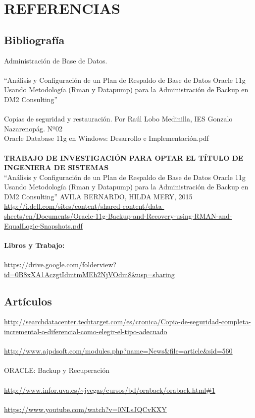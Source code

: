 \chapter{REFERENCIAS}
\section{Bibliografía}
Administración de Base de Datos.\\\\“Análisis y Configuración de un Plan de Respaldo de Base de Datos Oracle 11g Usando Metodología (Rman y Datapump) para la Administración de Backup en DM2 Consulting”\\\\Copias de seguridad y restauración. Por Raúl Lobo Medinilla, IES Gonzalo Nazarenopág. Nº02\\Oracle Database 11g en Windows: Desarrollo e Implementación.pdf\\\\\textbf{TRABAJO DE INVESTIGACIÓN PARA OPTAR EL TÍTULO DE INGENIERA DE SISTEMAS}\\“Análisis y Configuración de un Plan de Respaldo de Base de Datos Oracle 11g Usando Metodología (Rman y Datapump) para la Administración de Backup en DM2 Consulting” AVILA BERNARDO, HILDA MERY, 2015\\
\url{http://i.dell.com/sites/content/shared-content/data-sheets/en/Documents/Oracle-11g-Backup-and-Recovery-using-RMAN-and-EqualLogic-Snapshots.pdf}\\\\
\textbf{Libros y Trabajo:}\\\\
\url{https://drive.google.com/folderview?id=0B8xXA1AczgtIdmtmMEh2NjVOdm8&usp=sharing}

\section{Artículos}

\url{http://searchdatacenter.techtarget.com/es/cronica/Copia-de-seguridad-completa-incremental-o-diferencial-como-elegir-el-tipo-adecuado}\\\\\url{http://www.ajpdsoft.com/modules.php?name=News&file=article&sid=560}\\\\ORACLE: Backup y Recuperación\\\\\url{http://www.infor.uva.es/~jvegas/cursos/bd/oraback/oraback.html#1}\\\\\url{https://www.youtube.com/watch?v=0NLsJQCvKXY}\\\\

